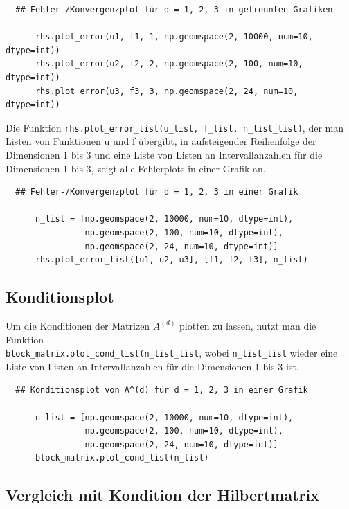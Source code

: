 \documentclass{scrartcl}
\begin{document}
\begin{verbatim}
  ## Fehler-/Konvergenzplot für d = 1, 2, 3 in getrennten Grafiken

      rhs.plot_error(u1, f1, 1, np.geomspace(2, 10000, num=10, dtype=int))
      rhs.plot_error(u2, f2, 2, np.geomspace(2, 100, num=10, dtype=int))
      rhs.plot_error(u3, f3, 3, np.geomspace(2, 24, num=10, dtype=int))
\end{verbatim}

Die Funktion \texttt{rhs.plot\_error\_list(u\_list, f\_list, n\_list\_list)}, der man Listen von Funktionen u und f übergibt, in aufsteigender Reihenfolge der Dimensionen 1 bis 3 und eine Liste von Listen an Intervallanzahlen für die Dimensionen 1 bis 3, zeigt alle Fehlerplots in einer Grafik an.

\begin{verbatim}
  ## Fehler-/Konvergenzplot für d = 1, 2, 3 in einer Grafik

      n_list = [np.geomspace(2, 10000, num=10, dtype=int),
                np.geomspace(2, 100, num=10, dtype=int),
                np.geomspace(2, 24, num=10, dtype=int)]
      rhs.plot_error_list([u1, u2, u3], [f1, f2, f3], n_list)
\end{verbatim}

\subsection{Konditionsplot}

Um die Konditionen der Matrizen $A^{(d)}$ plotten zu lassen, nutzt man die Funktion \\\texttt{block\_matrix.plot\_cond\_list(n\_list\_list}, wobei \texttt{n\_list\_list} wieder eine Liste von Listen an Intervallanzahlen für die Dimensionen 1 bis 3 ist.

\begin{verbatim}
  ## Konditionsplot von A^(d) für d = 1, 2, 3 in einer Grafik

      n_list = [np.geomspace(2, 10000, num=10, dtype=int),
                np.geomspace(2, 100, num=10, dtype=int),
                np.geomspace(2, 24, num=10, dtype=int)]
      block_matrix.plot_cond_list(n_list)
\end{verbatim}

\subsection{Vergleich mit Kondition der Hilbertmatrix}
\end{document}
